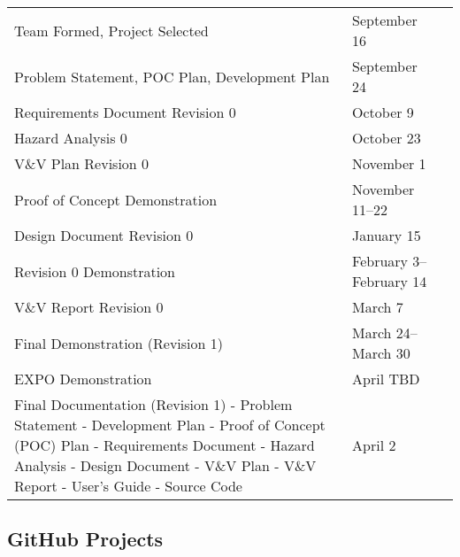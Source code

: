 \documentclass{article}
\begin{document}
\noindent \begin{tabular}{ p{9 cm} l r}

  Team Formed, Project Selected & September 16 \\

  Problem Statement, POC Plan, Development Plan & September 24  \\

  Requirements Document Revision 0 & October 9  \\

  Hazard Analysis 0 & October 23 \\

  V\&V Plan Revision 0 & November 1  \\

  Proof of Concept Demonstration & November 11--22  \\

  Design Document Revision 0 & January 15  \\

  Revision 0 Demonstration & February 3--February 14 \\

  V\&V Report Revision 0 & March 7  \\

  Final Demonstration (Revision 1) & March 24--March 30 \\

  EXPO Demonstration & April TBD \\

  Final Documentation (Revision 1)\newline 
   - Problem Statement\newline
   - Development Plan\newline
   - Proof of Concept (POC) Plan\newline
   - Requirements Document\newline
   - Hazard Analysis\newline
   - Design Document\newline
   - V\&V Plan\newline
   - V\&V Report\newline
   - User's Guide\newline
   - Source Code\newline &  April 2 \\
 
\end{tabular}

\subsection{GitHub Projects}
\end{document}
